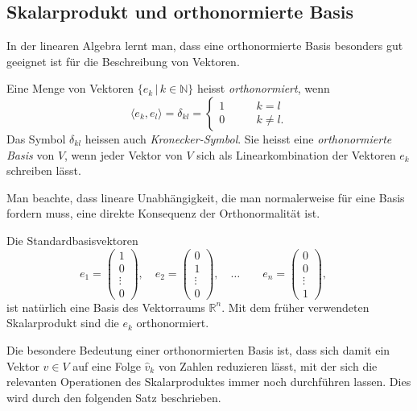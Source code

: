 \subsection{Skalarprodukt und orthonormierte Basis}
In der linearen Algebra lernt man, dass eine orthonormierte Basis besonders
gut geeignet ist für die Beschreibung von Vektoren.

\begin{definition}
Eine Menge von Vektoren $\{e_k\,|\, k\in\mathbb N\}$ heisst {\em orthonormiert},
%
wenn
\[
\langle e_k,e_l\rangle
=
\delta_{kl}
=
\begin{cases}
1 &\qquad k=l\\
0 &\qquad k\ne l.
\end{cases}
\]
Das Symbol $\delta_{kl}$ heissen auch {\em Kronecker-Symbol}.
%
%
%
Sie heisst eine {\em orthonormierte Basis} von $V$, wenn jeder Vektor
von $V$ sich als
%
%
Linearkombination der Vektoren $e_k$ schreiben lässt.
\end{definition}

Man beachte, dass lineare Unabhängigkeit, die man normalerweise für eine
Basis fordern muss, eine direkte Konsequenz der Orthonormalität ist.

Die Standardbasisvektoren
\[
e_1 = \begin{pmatrix}1\\0\\\vdots\\0\end{pmatrix},\quad
e_2 = \begin{pmatrix}0\\1\\\vdots\\0\end{pmatrix},\quad
\dots
\qquad
e_n = \begin{pmatrix}0\\0\\\vdots\\1\end{pmatrix},\quad
\]
ist natürlich eine Basis des Vektorraums $\mathbb R^n$.
Mit dem früher verwendeten Skalarprodukt sind die $e_k$ orthonormiert.

Die besondere Bedeutung einer orthonormierten Basis ist, dass sich damit
ein Vektor $v\in V$ auf eine Folge $\hat{v}_k$ von Zahlen reduzieren 
lässt, mit der sich die relevanten Operationen des Skalarproduktes
immer noch durchführen lassen.
Dies wird durch den folgenden Satz beschrieben.

